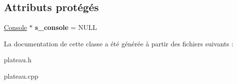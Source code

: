 \subsection*{Attributs protégés}
\begin{DoxyCompactItemize}
\item 
\hyperlink{classConsole}{Console} $\ast$ {\bfseries s\+\_\+console} = N\+U\+LL\hypertarget{classTableau_a2557f30daf3e8c13d803b3365be83a64}{}\label{classTableau_a2557f30daf3e8c13d803b3365be83a64}

\end{DoxyCompactItemize}


La documentation de cette classe a été générée à partir des fichiers suivants \+:\begin{DoxyCompactItemize}
\item 
plateau.\+h\item 
plateau.\+cpp\end{DoxyCompactItemize}
